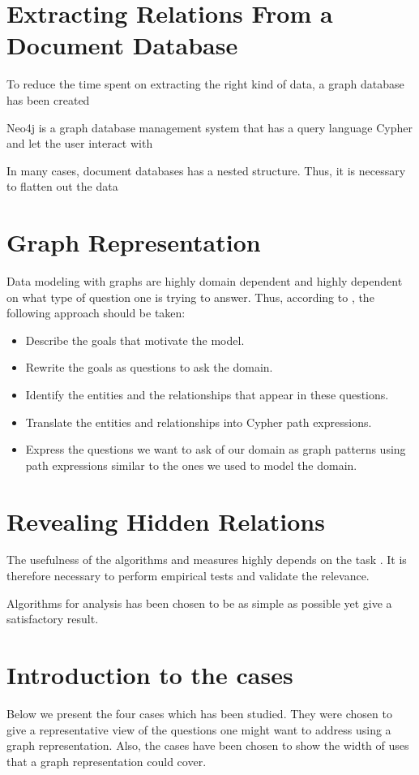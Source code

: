 \section{Extracting Relations From a Document Database}
To reduce the time spent on extracting the right kind of data, a graph database has been created

Neo4j is a graph database management system that has a query language Cypher and let the user interact with 

In many cases, document databases has a nested structure. Thus, it is necessary to flatten out the data

\section{Graph Representation}
Data modeling with graphs are highly domain dependent and highly dependent on what type of question one is trying to answer. Thus, according to \citet{robinson2013}, the following approach should be taken:
\begin{itemize}
    \item Describe the goals that motivate the model.
    \item Rewrite the goals as questions to ask the domain.
    \item Identify the entities and the relationships that appear in these questions. 
    \item Translate the entities and relationships into Cypher path expressions.
    \item Express the questions we want to ask of our domain as graph patterns using path expressions similar to the ones we used to model the domain. 
\end{itemize}

\section{Revealing Hidden Relations}

The usefulness of the algorithms and measures highly depends on the task \cite{fouss2016algorithms}. It is therefore necessary to perform empirical tests and validate the relevance. 

Algorithms for analysis has been chosen to be as simple as possible yet give a satisfactory result. 


\section{Introduction to the cases}
Below we present the four cases which has been studied. They were chosen to give a representative view of the questions one might want to address using a graph representation. Also, the cases have been chosen to show the width of uses that a graph representation could cover.


